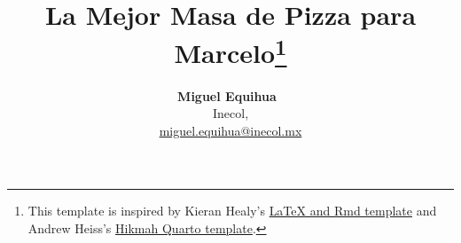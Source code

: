 \documentclass[
  12pt,
  letterpaper,
]{article}
\title{La Mejor Masa de Pizza para Marcelo\thanks{This template is
inspired by Kieran Healy's
\href{https://github.com/kjhealy/latex-custom-kjh}{LaTeX and Rmd
template} and Andrew Heiss's
\href{https://github.com/andrewheiss/hikmah-academic-quarto}{Hikmah
Quarto template}.}}
\author{
{\bfseries \normalsize Miguel Equihua~\orcidlink{0000-0001-5306-7397}}%
 \\%
 \small Inecol,  \\%
{\footnotesize \url{miguel.equihua@inecol.mx}} \\\vspace{10pt}
}
\date{}
\newenvironment{keywords}
{\small\sffamily{\sffamily\small\bfseries{Keywords.}}}
\begin{document}
\renewcommand{\abstractname}{Abstract.}


\maketitle
\begin{abstract}
Duis ornare ex ac iaculis pretium. Maecenas sagittis odio id erat
pharetra, sit amet consectetur quam sollicitudin. Vivamus pharetra quam
purus, nec sagittis risus pretium at. Nullam feugiat, turpis ac accumsan
interdum, sem tellus blandit neque, id vulputate diam quam semper nisl.
Donec sit amet enim at neque porttitor aliquet. Phasellus facilisis
nulla eget placerat eleifend. Vestibulum non egestas eros, eget lobortis
ipsum. Nulla rutrum massa eget enim aliquam, id porttitor erat luctus.
Nunc sagittis quis eros eu sagittis. Pellentesque dictum, erat at
pellentesque sollicitudin, justo augue pulvinar metus, quis rutrum est
mi nec felis. Vestibulum efficitur mi lorem, at elementum purus
tincidunt a. Aliquam finibus enim magna, vitae pellentesque erat
faucibus at. Nulla mauris tellus, imperdiet id lobortis et, dignissim
condimentum ipsum. Morbi nulla orci, varius at aliquet sed, facilisis id
tortor. Donec ut urna nisi.
\end{abstract}
\begin{keywords}
\def\sep{;\ }
Quarto\sep Typst\sep 
format
\end{keywords}


This document shows a practical usage of the template.

I use the Palmer penguins dataset (Horst, Hill, y Gorman 2020) to
demonstrate the features of the template. The code is available
\href{https://github.com/kazuyanagimoto/quarto-academic-typst}{here}.

\section{Section as Heading Level 1}\label{section-as-heading-level-1}

Section numbering can be specified in the YAML
\texttt{section-numbering} field as other Typst templates.

\subsection{Subsection as Heading Level
2}\label{subsection-as-heading-level-2}
\end{document}
